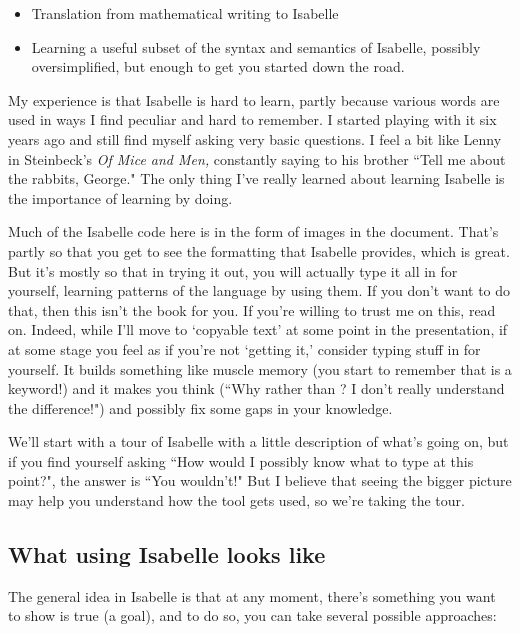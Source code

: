 \begin{itemize}
\item Translation from mathematical writing to Isabelle

\item  Learning a useful subset of the syntax and semantics of Isabelle, possibly oversimplified, but enough to get you started down the road. 
\end{itemize}

My experience is that Isabelle is hard to learn, partly because various words are used in ways I find peculiar and hard to remember. I started playing with it six years ago and still find myself asking very basic questions. I feel a bit like Lenny in Steinbeck's \emph{Of Mice and Men,} constantly saying to his brother ``Tell me about the rabbits, George." The only thing I've really learned about learning Isabelle is the importance of learning by doing. 

Much of the Isabelle code here is in the form of images in the document. That's partly so that you get to see the formatting that Isabelle provides, which is great. But it's mostly so that in trying it out, you will actually type it all in for yourself, learning patterns of the language by using them. If you don't want to do that, then this isn't the book for you. If you're willing to trust me on this, read on. Indeed, while I'll move to `copyable text' at some point in the presentation, if at some stage you feel as if you're not `getting it,' consider typing stuff in for yourself. It builds something like muscle memory (you start to remember that  is a keyword!) and it makes you think (``Why   rather than ? I don't really understand the difference!") and possibly fix some gaps in your knowledge. 

We'll start with a tour of Isabelle with a little description of what's going on, but if you find yourself asking ``How would I possibly know what to type at this point?", the answer is ``You wouldn't!" But I believe that seeing the bigger picture may help you understand how the tool gets used, so we're taking the tour. 

\subsection{What using Isabelle looks like}

The general idea in Isabelle is that at any moment, there's something you want to show is true (a goal), and to do so, you can take several possible approaches: 


